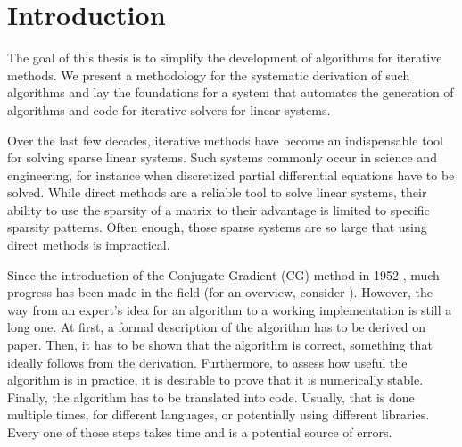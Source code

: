 \chapter{Introduction}

The goal of this thesis is to simplify the development of algorithms for iterative methods. We present a methodology for the systematic derivation of such algorithms and lay the foundations for a system that automates the generation of algorithms and code for iterative solvers for linear systems.


Over the last few decades, iterative methods have become an indispensable tool for solving sparse linear systems. Such systems commonly occur in science and engineering, for instance when discretized partial differential equations have to be solved. While direct methods are a reliable tool to solve linear systems, their ability to use the sparsity of a matrix to their advantage is limited to specific sparsity patterns.
Often enough, those sparse systems are so large that using direct methods is impractical.

Since the introduction of the Conjugate Gradient (CG) method in 1952 \cite{hestenes1952methods}, much progress has been made in the field (for an overview, consider \cite{barrett:templates, saad2000iterative, vanderVorst:book}).
%
%
%
%
However, the way from an expert's idea for an algorithm to a working implementation is still a long one.
At first, a formal description of the algorithm has to be derived on paper. Then, it has to be shown that the algorithm is correct, something that ideally follows from the derivation. Furthermore, to assess how useful the algorithm is in practice, it is desirable to prove that it is numerically stable. Finally, the algorithm has to be translated into code. Usually, that is done multiple times, for different languages, or potentially using different libraries. Every one of those steps takes time and is a potential source of errors.

